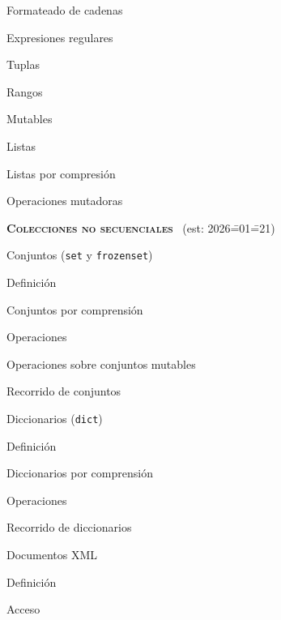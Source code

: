 \begin{longenum}
\begin{longenum}
\begin{longenum}
\begin{longenum}
                \item Formateado de cadenas
                \item Expresiones regulares
            \end{longenum}
            \item Tuplas
            \item Rangos
        \end{longenum}
        \item Mutables
        \begin{longenum}
            \item Listas
            \begin{longenum}
                \item Listas por compresión
            \end{longenum}
            \item Operaciones mutadoras
        \end{longenum}
    \end{longenum}
    \item \textbf{\textsc{Colecciones no secuenciales}} \ (est: 2026\==01\==21)
    \begin{longenum}
        \item Conjuntos (\texttt{set} y \texttt{frozenset})
        \begin{longenum}
            \item Definición
            \item Conjuntos por comprensión
            \item Operaciones
            \item Operaciones sobre conjuntos mutables
            \item Recorrido de conjuntos
        \end{longenum}
        \item Diccionarios (\texttt{dict})
        \begin{longenum}
            \item Definición
            \item Diccionarios por comprensión
            \item Operaciones
            \item Recorrido de diccionarios
        \end{longenum}
        \item Documentos XML
        \begin{longenum}
            \item Definición
            \item Acceso

\end{longenum}
\end{longenum}
\end{longenum}
